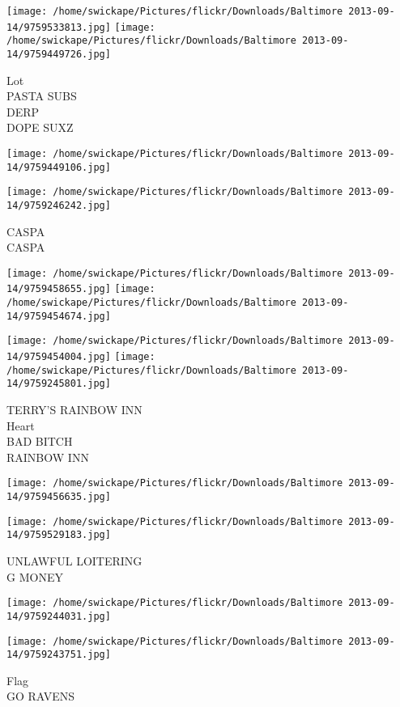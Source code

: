 \documentclass[10pt,letterpaper]{article}
\begin{document}
\texttt{[image: /home/swickape/Pictures/flickr/Downloads/Baltimore 2013-09-14/9759533813.jpg]}
\texttt{[image: /home/swickape/Pictures/flickr/Downloads/Baltimore 2013-09-14/9759449726.jpg]}

Lot\\
PASTA SUBS\\
DERP\\
DOPE SUXZ
\pagebreak

\texttt{[image: /home/swickape/Pictures/flickr/Downloads/Baltimore 2013-09-14/9759449106.jpg]}

\vspace{0.25in}
\texttt{[image: /home/swickape/Pictures/flickr/Downloads/Baltimore 2013-09-14/9759246242.jpg]}

CASPA\\
CASPA
\pagebreak

\texttt{[image: /home/swickape/Pictures/flickr/Downloads/Baltimore 2013-09-14/9759458655.jpg]}
\texttt{[image: /home/swickape/Pictures/flickr/Downloads/Baltimore 2013-09-14/9759454674.jpg]}

\texttt{[image: /home/swickape/Pictures/flickr/Downloads/Baltimore 2013-09-14/9759454004.jpg]}
\texttt{[image: /home/swickape/Pictures/flickr/Downloads/Baltimore 2013-09-14/9759245801.jpg]}

TERRY'S RAINBOW INN\\
Heart\\
BAD BITCH\\
RAINBOW INN
\pagebreak

\texttt{[image: /home/swickape/Pictures/flickr/Downloads/Baltimore 2013-09-14/9759456635.jpg]}

\vspace{0.25in}
\texttt{[image: /home/swickape/Pictures/flickr/Downloads/Baltimore 2013-09-14/9759529183.jpg]}

UNLAWFUL LOITERING\\
G MONEY
\pagebreak

\texttt{[image: /home/swickape/Pictures/flickr/Downloads/Baltimore 2013-09-14/9759244031.jpg]}

\vspace{0.25in}
\texttt{[image: /home/swickape/Pictures/flickr/Downloads/Baltimore 2013-09-14/9759243751.jpg]}

Flag\\
GO RAVENS
\pagebreak
\end{document}

